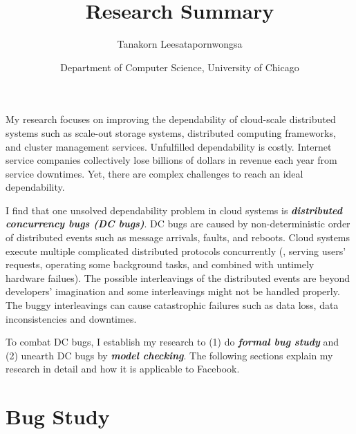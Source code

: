 \documentclass[11pt]{article}
\begin{document}
\title{Research Summary}
\author{Tanakorn Leesatapornwongsa}
\date{\vspace{-1ex} \small{Department of Computer Science, University of
Chicago}}

\maketitle

\vspace{-1ex} 
My research focuses on improving the dependability of cloud-scale distributed
systems such as scale-out storage systems, distributed computing frameworks,
and cluster management services. Unfulfilled dependability is costly. Internet
service companies collectively lose billions of dollars in revenue each year
from service downtimes. Yet, there are complex challenges to reach an ideal
dependability. 


I find that one unsolved dependability problem in cloud systems is
\textbf{\textit{distributed concurrency bugs (DC bugs)}}. DC bugs are caused by
non-deterministic order of distributed events such as message arrivals, faults,
and reboots. Cloud systems execute multiple complicated distributed protocols
concurrently (\eg, serving users' requests, operating some background tasks,
and combined with untimely hardware failues). The possible interleavings of the
distributed events are beyond developers' imagination and some interleavings
might not be handled properly. The buggy interleavings can cause catastrophic
failures such as data loss, data inconsistencies and downtimes. 


To combat DC bugs, I establish my research to (1) do \textbf{\textit{formal bug
study}} and (2) unearth DC bugs by \textbf{\textit{model checking}}. The
following sections explain my research in detail and how it is applicable to
Facebook.

\section{Bug Study}
\end{document}
